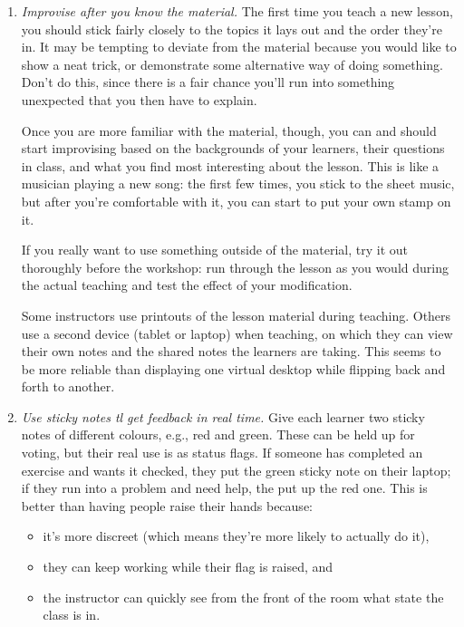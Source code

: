 \begin{enumerate}
\item
  \emph{Improvise after you know the material.}  The first time you
  teach a new lesson, you should stick fairly closely to the topics it
  lays out and the order they're in.  It may be tempting to deviate
  from the material because you would like to show a neat trick, or
  demonstrate some alternative way of doing something. Don't do this,
  since there is a fair chance you'll run into something unexpected
  that you then have to explain.

  Once you are more familiar with the material, though, you can and
  should start improvising based on the backgrounds of your learners,
  their questions in class, and what you find most interesting about
  the lesson.  This is like a musician playing a new song: the first
  few times, you stick to the sheet music, but after you're
  comfortable with it, you can start to put your own stamp on it.

  If you really want to use something outside of the material, try it
  out thoroughly before the workshop: run through the lesson as you
  would during the actual teaching and test the effect of your
  modification.

  Some instructors use printouts of the lesson material during
  teaching.  Others use a second device (tablet or laptop) when
  teaching, on which they can view their own notes and the shared
  notes the learners are taking. This seems to be more reliable than
  displaying one virtual desktop while flipping back and forth to
  another.

\item
  \emph{Use sticky notes tl get feedback in real time.}  Give each
  learner two sticky notes of different colours, e.g., red and
  green. These can be held up for voting, but their real use is as
  status flags. If someone has completed an exercise and wants it
  checked, they put the green sticky note on their laptop; if they run
  into a problem and need help, the put up the red one. This is better
  than having people raise their hands because:

  \begin{itemize}

  \item
    it's more discreet (which means they're more likely to
    actually do it),

  \item
    they can keep working while their flag is raised, and

  \item
    the instructor can quickly see from the front of the room what
    state the class is in.


\end{itemize}
\end{enumerate}
